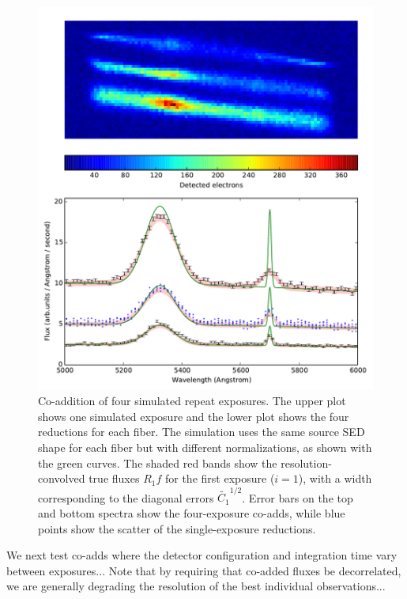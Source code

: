 \documentclass[12pt]{article}
\begin{document}
\begin{figure}[htb]
\begin{center}
\includegraphics[width=5.5in]{fig/repeats}
\caption{Co-addition of four simulated repeat exposures. The upper plot shows one simulated exposure and the lower plot shows the four reductions for each fiber. The simulation uses the same source SED shape for each fiber but with different normalizations, as shown with the green curves.  The shaded red bands show the resolution-convolved true fluxes $R_1 f$ for the first exposure ($i=1$), with a width corresponding to the diagonal errors $\tilde{C_1}^{1/2}$. Error bars on the top and bottom spectra show the four-exposure co-adds, while blue points show the scatter of the single-exposure reductions.}
\label{fig:repeats}
\end{center}
\end{figure}

We next test co-adds where the detector configuration and integration time vary between exposures... Note that by requiring that co-added fluxes be decorrelated, we are generally degrading the resolution of the best individual observations...
\end{document}

